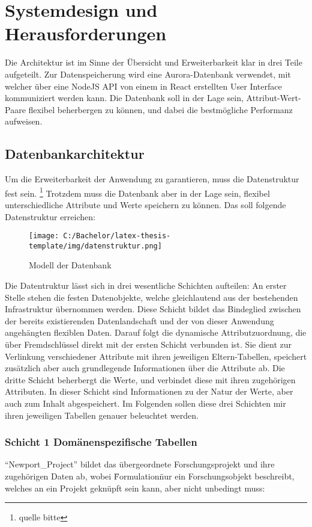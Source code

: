 \section{Systemdesign und Herausforderungen}
Die Architektur ist im Sinne der Übersicht und Erweiterbarkeit klar in drei Teile aufgeteilt. 
Zur Datenspeicherung wird eine Aurora-Datenbank verwendet, mit welcher über eine NodeJS API von einem in 
React erstellten User Interface kommuniziert werden kann. Die Datenbank soll in der Lage sein, 
Attribut-Wert-Paare flexibel beherbergen zu können, und dabei die bestmögliche Performanz aufweisen.
\subsection{Datenbankarchitektur}
Um die Erweiterbarkeit der Anwendung zu garantieren, muss die Datenstruktur fest sein. \footnote{quelle bitte} Trotzdem muss die Datenbank aber 
in der Lage sein, flexibel unterschiedliche Attribute und Werte speichern zu können. Das soll folgende Datenstruktur erreichen:\break

\begin{figure}[hbt]
    \centering
    \texttt{[image: C:/Bachelor/latex-thesis-template/img/datenstruktur.png]} 
    \caption{Modell der Datenbank}
    \label{fig:deinbild}
\end{figure}
Die Datentruktur lässt sich in drei wesentliche Schichten aufteilen: An erster Stelle stehen die festen Datenobjekte, 
welche gleichlautend aus der bestehenden Infrastruktur übernommen werden. Diese Schicht bildet das Bindeglied zwischen der bereits existierenden Datenlandschaft 
und der von dieser Anwendung angehängten flexiblen Daten. Darauf folgt die dynamische Attributzuordnung, die über Fremdschlüssel direkt mit der ersten Schicht verbunden ist.
Sie dient zur Verlinkung verschiedener Attribute mit ihren jeweiligen Eltern-Tabellen, speichert zusätzlich aber auch grundlegende Informationen über die Attribute ab. 
Die dritte Schicht beherbergt die Werte, und verbindet diese mit ihren zugehörigen Attributen. In dieser Schicht sind Informationen zu der Natur der Werte, aber auch zum Inhalt abgespeichert. 
Im Folgenden sollen diese drei Schichten mir ihren jeweiligen Tabellen genauer beleuchtet werden. 
\subsubsection{Schicht 1 Domänenspezifische Tabellen}
\enquote{Newport\_Project} bildet das übergeordnete Forschungsprojekt und ihre zugehörigen Daten ab, wobei \"Formulation\" nur ein Forschungsobjekt beschreibt, welches an ein Projekt geknüpft sein kann,
aber nicht unbedingt muss: 


